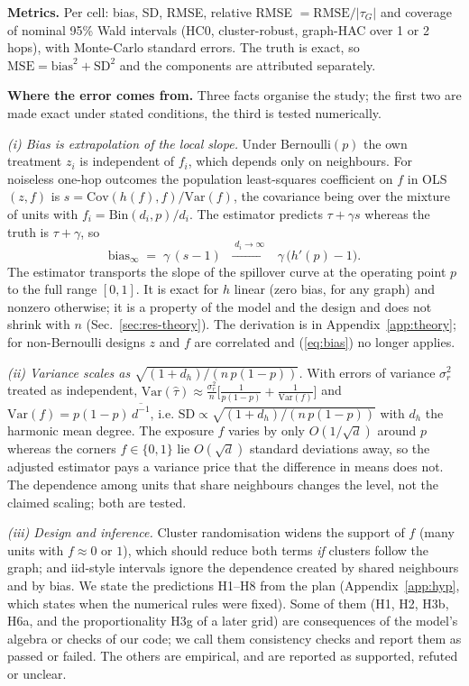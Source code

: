 \textbf{Metrics.}
Per cell: bias, SD, RMSE, relative RMSE $=\mathrm{RMSE}/|\tau_G|$ and coverage of nominal 95\% Wald intervals (HC0, cluster-robust, graph-HAC over 1 or 2 hops), with
Monte-Carlo standard errors. The truth is exact, so $\mathrm{MSE}=\mathrm{bias}^2+\mathrm{SD}^2$ and the components are attributed separately.

\textbf{Where the error comes from.}
Three facts organise the study; the first two are made exact under stated conditions, the third is tested numerically.

\emph{(i) Bias is extrapolation of the local slope.} Under Bernoulli$(p)$ the own treatment $z_i$ is independent of $f_i$, which depends only on
neighbours. For noiseless one-hop outcomes the population least-squares coefficient on $f$ in OLS$(z,f)$ is
$s=\mathrm{Cov}(h(f),f)/\mathrm{Var}(f)$, the covariance being over the mixture of units with $f_i=\mathrm{Bin}(d_i,p)/d_i$. The estimator predicts $\tau+\gamma s$ whereas
the truth is $\tau+\gamma$, so
\begin{equation}\label{eq:bias}
  \mathrm{bias}_\infty \;=\; \gamma\,(s-1)\;\;\xrightarrow{\;d_i\to\infty\;}\;\;\gamma\,\big(h'(p)-1\big).
\end{equation}
The estimator transports the slope of the spillover curve at the operating point $p$ to the full range $[0,1]$. It is exact for $h$ linear (zero bias, for
any graph) and nonzero otherwise; it is a property of the model and the design and does not shrink with $n$ (Sec.~\ref{sec:res-theory}).
The derivation is in Appendix~\ref{app:theory}; for non-Bernoulli designs $z$ and $f$ are correlated and (\ref{eq:bias}) no longer applies.

\emph{(ii) Variance scales as $\sqrt{(1+d_h)/(n\,p(1-p))}$.} With errors of variance $\sigma_r^2$ treated as independent, $\mathrm{Var}(\hat\tau)\approx
\frac{\sigma_r^2}{n}\big[\frac1{p(1-p)}+\frac1{\mathrm{Var}(f)}\big]$ and $\mathrm{Var}(f)=p(1-p)\,\overline{d^{-1}}$, i.e.
$\mathrm{SD}\propto\sqrt{(1+d_h)/(n\,p(1-p))}$ with $d_h$ the harmonic mean degree. The exposure $f$ varies by only $O(1/\sqrt d)$ around $p$ whereas the
corners $f\in\{0,1\}$ lie $O(\sqrt d)$ standard deviations away, so the adjusted estimator pays a variance price that the difference in means does not.
The dependence among units that share neighbours changes the level, not the claimed scaling; both are tested.

\emph{(iii) Design and inference.} Cluster randomisation widens the support of $f$ (many units with $f\approx 0$ or $1$), which should reduce both
terms \emph{if} clusters follow the graph; and iid-style intervals ignore the dependence created by shared neighbours and by bias. We state the
predictions H1--H8 from the plan (Appendix~\ref{app:hyp}, which states when the numerical rules were fixed). Some of them (H1, H2, H3b, H6a, and the proportionality H3g of a later grid) are consequences of the model's algebra or checks of our code; we call them consistency checks and report them as passed or failed. The others are empirical, and are reported as supported, refuted or unclear.
